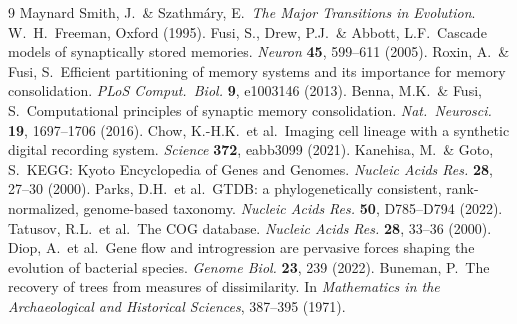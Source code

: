 \documentclass[11pt]{article}
\begin{document}
\begin{thebibliography}{9}
 Maynard Smith, J.\ \& Szathmáry, E.\ \emph{The Major Transitions in Evolution}. W.\ H.\ Freeman, Oxford (1995).
 Fusi, S., Drew, P.J.\ \& Abbott, L.F.\ Cascade models of synaptically stored memories. \emph{Neuron} \textbf{45}, 599--611 (2005).
 Roxin, A.\ \& Fusi, S.\ Efficient partitioning of memory systems and its importance for memory consolidation. \emph{PLoS Comput.\ Biol.} \textbf{9}, e1003146 (2013).
 Benna, M.K.\ \& Fusi, S.\ Computational principles of synaptic memory consolidation. \emph{Nat.\ Neurosci.} \textbf{19}, 1697--1706 (2016).
 Chow, K.-H.K.\ et al.\ Imaging cell lineage with a synthetic digital recording system. \emph{Science} \textbf{372}, eabb3099 (2021).
 Kanehisa, M.\ \& Goto, S.\ KEGG: Kyoto Encyclopedia of Genes and Genomes. \emph{Nucleic Acids Res.} \textbf{28}, 27--30 (2000).
 Parks, D.H.\ et al.\ GTDB: a phylogenetically consistent, rank-normalized, genome-based taxonomy. \emph{Nucleic Acids Res.} \textbf{50}, D785--D794 (2022).
 Tatusov, R.L.\ et al.\ The COG database. \emph{Nucleic Acids Res.} \textbf{28}, 33--36 (2000).
 Diop, A.\ et al.\ Gene flow and introgression are pervasive forces shaping the evolution of bacterial species. \emph{Genome Biol.} \textbf{23}, 239 (2022).
 Buneman, P.\ The recovery of trees from measures of dissimilarity. In \emph{Mathematics in the Archaeological and Historical Sciences}, 387--395 (1971).
\end{thebibliography}
\end{document}

